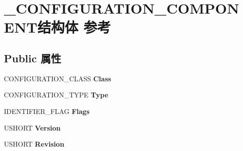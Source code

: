 \hypertarget{struct___c_o_n_f_i_g_u_r_a_t_i_o_n___c_o_m_p_o_n_e_n_t}{}\section{\+\_\+\+C\+O\+N\+F\+I\+G\+U\+R\+A\+T\+I\+O\+N\+\_\+\+C\+O\+M\+P\+O\+N\+E\+N\+T结构体 参考}
\label{struct___c_o_n_f_i_g_u_r_a_t_i_o_n___c_o_m_p_o_n_e_n_t}
\subsection*{Public 属性}
\begin{DoxyCompactItemize}
\item 
\mbox{\label{struct___c_o_n_f_i_g_u_r_a_t_i_o_n___c_o_m_p_o_n_e_n_t_a9bb3813969de0f848f32a32f8f658c20}} 
C\+O\+N\+F\+I\+G\+U\+R\+A\+T\+I\+O\+N\+\_\+\+C\+L\+A\+SS {\bfseries Class}
\item 
\mbox{\label{struct___c_o_n_f_i_g_u_r_a_t_i_o_n___c_o_m_p_o_n_e_n_t_a14a4e88914b73dbe365b051728cdcc13}} 
C\+O\+N\+F\+I\+G\+U\+R\+A\+T\+I\+O\+N\+\_\+\+T\+Y\+PE {\bfseries Type}
\item 
\mbox{\label{struct___c_o_n_f_i_g_u_r_a_t_i_o_n___c_o_m_p_o_n_e_n_t_a92d0bd8829f2f024712c2fe19095d80c}} 
I\+D\+E\+N\+T\+I\+F\+I\+E\+R\+\_\+\+F\+L\+AG {\bfseries Flags}
\item 
\mbox{\label{struct___c_o_n_f_i_g_u_r_a_t_i_o_n___c_o_m_p_o_n_e_n_t_ae607dd80e1593805fc31401c00160107}} 
U\+S\+H\+O\+RT {\bfseries Version}
\item 
\mbox{\label{struct___c_o_n_f_i_g_u_r_a_t_i_o_n___c_o_m_p_o_n_e_n_t_a9d65b3d0f585a22416d9960eecfa8735}} 
U\+S\+H\+O\+RT {\bfseries Revision}
\item 
\mbox{\label{struct___c_o_n_f_i_g_u_r_a_t_i_o_n___c_o_m_p_o_n_e_n_t_a159c846e9106e9fbc98d1c6e240db447}} 

\end{DoxyCompactItemize}
